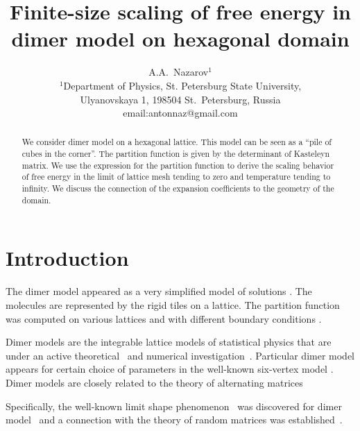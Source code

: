\documentclass{article}
\begin{document}
\title{Finite-size scaling of free energy in dimer model on hexagonal domain}

\author{A.A.~Nazarov$^{1}$\\
{\small
  $^{1}$Department of Physics, St. Petersburg State University,} \\
{\small  Ulyanovskaya 1, 198504 St.~Petersburg, Russia}\\
\small{email:antonnaz@gmail.com}
}
\date{}
\maketitle

\begin{abstract}
    We consider dimer model on a hexagonal lattice. This model can be seen as a ``pile of cubes in the
  corner''. The partition function is given by the determinant of Kasteleyn matrix. We use the
  expression for the partition function to derive the scaling behavior of free energy in the limit
  of lattice mesh tending to zero and temperature tending to infinity. We discuss the connection of
  the expansion coefficients to the geometry of the domain.
\end{abstract}


\section*{Introduction}
\label{sec:introduction}
The dimer model appeared as a very simplified model of solutions \cite{Fowler-1937}. The molecules
are represented by the rigid tiles on a lattice. The partition function was computed on various
lattices and with different boundary conditions \cite{doi:10.1080/14786436108243366,
  P.W-1961,kenyon2009lectures}.

Dimer models are the integrable lattice models of statistical physics that are under an active
theoretical~\cite{zj2000,ferrari} and numerical
investigation~\cite{ks2018}. Particular dimer model appears for certain choice
of parameters in the well-known six-vertex model  \cite{pronko2017thesis}. Dimer models are
closely related to the theory of alternating matrices \cite{elkies1992alternating1,elkies1992alternating2}

Specifically, the well-known limit shape phenomenon~\cite{vershik1977kerov} was discovered for dimer
model~\cite{kenyon2006dimers} and a connection with the theory of random matrices was
established~\cite{johansson2002non}.
\end{document}
